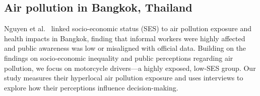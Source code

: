 


\subsection{Air pollution in Bangkok, Thailand}
Nguyen et al.~\cite{nguyen2023bangkokpollution} linked socio-economic status (SES) to air pollution exposure and health impacts in Bangkok, finding that informal workers were highly affected and public awareness was low or misaligned with official data.
Building on the findings on socio-economic inequality and public perceptions regarding air pollution, we focus on motorcycle drivers—a highly exposed, low-SES group.
Our study measures their hyperlocal air pollution exposure and uses interviews to explore how their perceptions influence decision-making.

